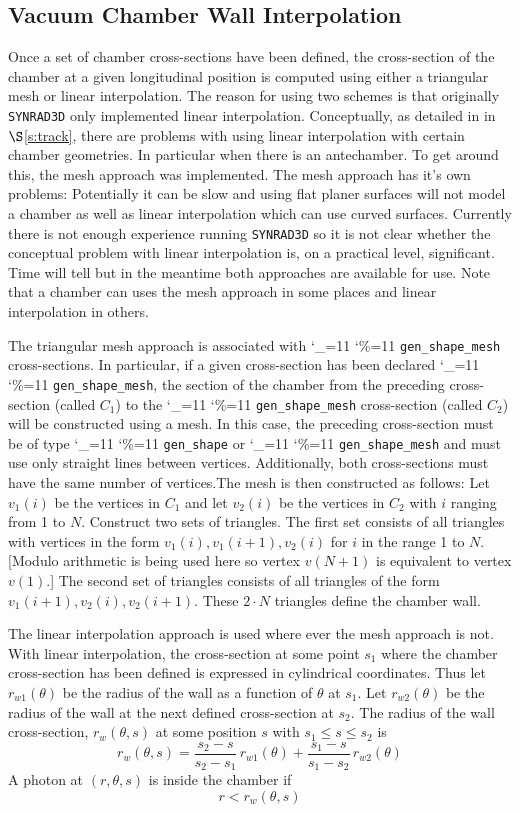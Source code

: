 \documentclass[11pt]{article}
\newcommand{\sref}[1]{$\S$\ref{#1}}
\newcommand{\srthree}{\texttt{SYNRAD3D}\xspace}
\newcommand\ttcmd{\begingroup\catcode`\_=11 \catcode`\%=11 \dottcmd}
\newcommand\dottcmd[1]{\texttt{#1}\endgroup}
\newcommand{\Begineq}{\begin{equation}}
\newcommand{\Endeq}{\end{equation}}
\newcommand{\vn}{\ttcmd}
\begin{document}
\subsection{Vacuum Chamber Wall Interpolation} 
\label{s:wall}

Once a set of chamber cross-sections have been defined, the
cross-section of the chamber at a given longitudinal position is
computed using either a triangular mesh or linear interpolation. The
reason for using two schemes is that originally \srthree only
implemented linear interpolation.  Conceptually, as detailed in in
\sref{s:track}, there are problems with using linear interpolation
with certain chamber geometries. In particular when there is an
antechamber. To get around this, the mesh approach was implemented.
The mesh approach has it's own problems: Potentially it can be slow
and using flat planer surfaces will not model a chamber as well as
linear interpolation which can use curved surfaces. Currently there
is not enough experience running \srthree so it is not clear whether
the conceptual problem with linear interpolation is, on a practical
level, significant. Time will tell but in the meantime both approaches
are available for use. Note that a chamber can uses the mesh approach
in some places and linear interpolation in others.

The triangular mesh approach is associated with \vn{gen_shape_mesh}
cross-sections. In particular, if a given cross-section has been
declared \vn{gen_shape_mesh}, the section of the chamber from the
preceding cross-section (called $C_1$) to the \vn{gen_shape_mesh}
cross-section (called $C_2$) will be constructed using a mesh. In this
case, the preceding cross-section must be of type \vn{gen_shape} or
\vn{gen_shape_mesh} and must use only straight lines between
vertices. Additionally, both cross-sections must have the same number
of vertices.The mesh is then constructed as follows: Let $v_1(i)$ be
the vertices in $C_1$ and let $v_2(i)$ be the vertices in $C_2$ with
$i$ ranging from 1 to $N$. Construct two sets of triangles. The first
set consists of all triangles with vertices in the form $v_1(i),
v_1(i+1), v_2(i)$ for $i$ in the range 1 to $N$. [Modulo arithmetic is
being used here so vertex $v(N+1)$ is equivalent to vertex $v(1)$.]
The second set of triangles consists of all triangles of the form
$v_1(i+1), v_2(i), v_2(i+1)$. These $2 \cdot N$ triangles define the
chamber wall.

The linear interpolation approach is used where ever the mesh approach
is not.  With linear interpolation, the cross-section at some point
$s_1$ where the chamber cross-section has been defined is expressed in
cylindrical coordinates.  Thus let $r_{w1}(\theta)$ be the radius of
the wall as a function of $\theta$ at $s_1$.  Let $r_{w2}(\theta)$ be
the radius of the wall at the next defined cross-section at $s_2$. The
radius of the wall cross-section, $r_w(\theta, s)$ at some position
$s$ with $s_1 \le s \le s_2$ is
\Begineq
  r_w(\theta, s) = 
  \frac{s_2 - s}{s_2 - s_1} \, r_{w1}(\theta) + 
  \frac{s_1 - s}{s_1 - s_2} \, r_{w2}(\theta)
\Endeq
A photon at $(r,\theta, s)$ is inside the chamber if
\Begineq
  r < r_w(\theta, s)
\Endeq
\end{document}
